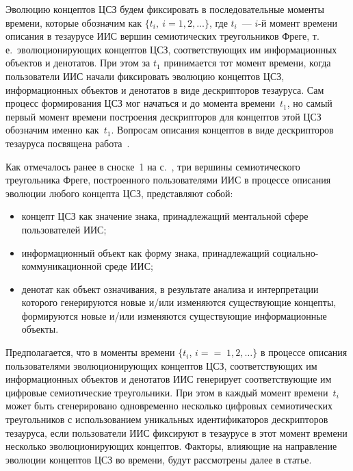 \begin{multicols}{2}
   Эволюцию концептов ЦСЗ будем фиксировать в последовательные моменты времени, 
которые обозначим как $\{t_i, \ i = 1, 2, \ldots\}$, где $t_i$~--- $i$-й момент времени описания в 
тезаурусе ИИС вершин семиотических треугольников Фреге, т.\,е.\ эволюционирующих 
концептов ЦСЗ, соответствующих им информационных объектов и денотатов. При этом за 
$t_1$ принимается тот момент времени, когда пользователи ИИС начали фиксировать 
эволюцию концептов ЦСЗ, информационных объектов и денотатов в виде дескрипторов 
тезауруса. Сам процесс формирования ЦСЗ мог начаться и до момента времени~$t_1$, но 
самый первый момент времени построения дескрипторов для концептов этой ЦСЗ обозначим 
именно как~$t_1$. Вопросам описания концептов в виде дескрипторов тезауруса посвящена 
работа~\cite{7zat}.
   
   Как отмечалось ранее в сноске~1 на с.~\pageref{prim}, три вершины семиотического треугольника Фреге, 
построенного пользователями ИИС в процессе описания эволюции любого концепта ЦСЗ, 
представляют собой:
   \begin{itemize}
\item концепт ЦСЗ как значение знака, принадлежащий ментальной сфере 
пользователей ИИС;
\item информационный объект как форму знака, принадлежащий 
социально-ком\-му\-ни\-ка\-ци\-он\-ной среде ИИС;
\item денотат как объект означивания, в результате анализа и интерпретации 
которого генерируются новые и/или изменяются существующие концепты, 
формируются новые и/или изменяются существующие информационные объ\-екты.
\end{itemize}

   Предполагается, что в моменты времени $\{t_i$, $i =$\linebreak $=\;1, 2, \ldots\}$ в процессе описания 
пользователями эволюционирующих концептов ЦСЗ, со\-от\-вет\-ст\-ву\-ющих им информационных 
объектов и денотатов ИИС генерирует соответствующие им цифровые семиотические 
треугольники. При этом в каж\-дый момент времени~$t_i$ может быть сгенерировано 
одновременно несколько цифровых семиотических треугольников с использованием 
уникальных идентификаторов дескрипторов тезауруса, если пользователи ИИС фиксируют в 
тезаурусе в этот момент времени несколько эволюционирующих концептов. Факторы, 
влияющие на направление эволюции концептов ЦСЗ во времени, будут рассмотрены далее в 
статье.
   

\end{multicols}
